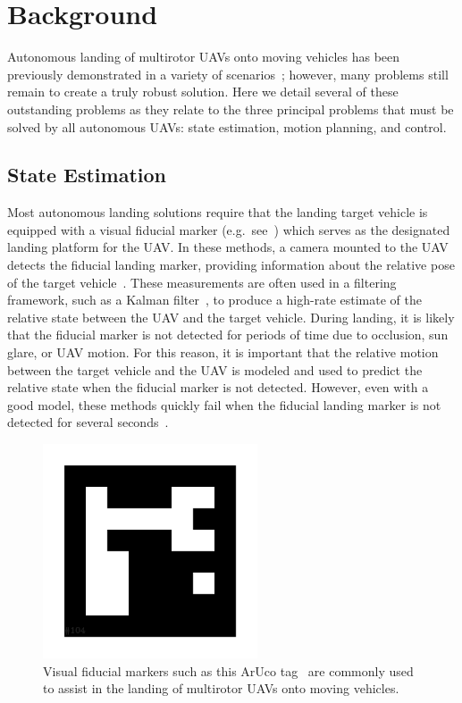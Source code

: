 \section{Background}

Autonomous landing of multirotor UAVs onto moving vehicles has been previously
demonstrated in a variety of scenarios~\cite{wynn2019visual}; however, many problems still remain to
create a truly robust solution. Here we detail several of these outstanding
problems as they relate to the three principal problems that must be solved by
all autonomous UAVs: state estimation, motion planning, and control.

\subsection{State Estimation}
Most autonomous landing solutions require that the landing target vehicle is equipped
with a visual fiducial marker (e.g.~see~)
which serves as
the designated landing platform for the UAV.
In these methods, a camera mounted to the UAV detects the fiducial landing marker, providing
information about the relative pose of the target
vehicle~\cite{borowczyk2017autonomous}. These measurements are often used in a
filtering framework, such as a Kalman filter~\cite{kalman}, to produce a
high-rate estimate of the relative state between the UAV and the target
vehicle. During landing, it is likely
that the fiducial marker is not detected for periods of time due to occlusion,
sun glare, or UAV motion. For this reason, it is important that the relative
motion between the target vehicle and the UAV is modeled and used to predict
the relative state when the fiducial marker is not detected.
However, even with a good model,
these methods quickly fail when the fiducial landing
marker is not detected for several seconds~\cite{ling2014precision}.

\begin{figure}[h]
  \centering
  \includegraphics[width=2.5in]{figures/aruco_104.png}
  \caption[Visual Fiducial Marker]{Visual fiducial markers such as this
    ArUco tag~\cite{garrido2016generation} are commonly used to assist in the
  landing of multirotor UAVs onto moving vehicles.}
  \label{fig:aruco_tag}
\end{figure}

